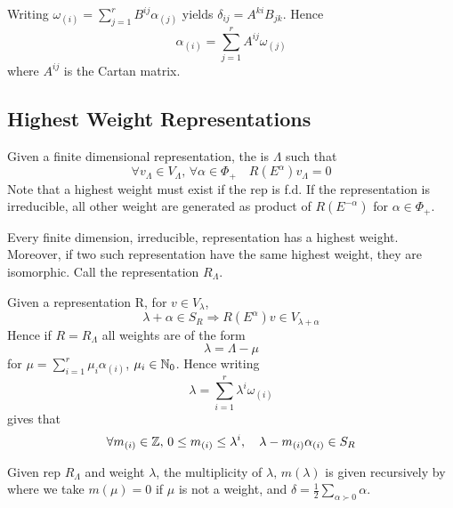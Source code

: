 \documentclass{article}
\begin{document}
\begin{fact}
	Writing $\omega_{(i)}=\sum_{j=1}^r B^{ij} \alpha_{(j)}$ yields $\delta_{ij}=A^{ki}B_{jk}$. Hence 
	\[
	\alpha_{(i)}=\sum_{j=1}^r A^{ij} \omega_{(j)}
	\]
	where $A^{ij}$ is the Cartan matrix. 
\end{fact}

\subsection{Highest Weight Representations}

\begin{definition}
	Given a finite dimensional representation, the  is $\Lambda$ such that 
	\[
	\forall v_\Lambda\in V_\Lambda, \, \forall \alpha\in\Phi_+ \quad R(E^\alpha)v_\Lambda=0
	\]
	Note that a highest weight must exist if the rep is f.d. If the representation is irreducible, all other weight are generated as product of $R(E^{-\alpha})$ for $\alpha\in\Phi_+$. 
\end{definition}

\begin{theorem}
	Every finite dimension, irreducible, representation has a highest weight. Moreover, if two such representation have the same highest weight, they are isomorphic. Call the representation $R_\Lambda$. 
\end{theorem}

\begin{fact}
	Given a representation R, for $v\in V_\lambda$, 
	\[
	\lambda+\alpha\in S_R \Rightarrow R(E^\alpha)v \in V_{\lambda+\alpha}
	\]
	Hence if $R=R_\Lambda$ all weights are of the form 
	\[
	\lambda=\Lambda-\mu
	\]
	for $\mu=\sum_{i=1}^r \mu_i \alpha_{(i)}$, $\mu_i\in\mathbb{N}_0$. Hence writing 
	\[
	\lambda=\sum_{i=1}^r \lambda^i \omega_{(i)}
	\]
	gives that
	\[
	\forall m_{(i)}\in\mathbb{Z}, \, 0\leq m_{(i)}\leq \lambda^i, \quad \lambda-m_{(i)}\alpha_{(i)}\in S_R
	\]
\end{fact}

\begin{theorem}
	Given rep $R_\Lambda$ and weight $\lambda$, the multiplicity of $\lambda, \, m(\lambda)$ is given recursively by 
where we take $m(\mu)=0$ if $\mu$ is not a weight, and $\delta = \frac{1}{2} \sum_{\alpha \succ 0} \alpha$. 
\end{theorem}
\end{document}
